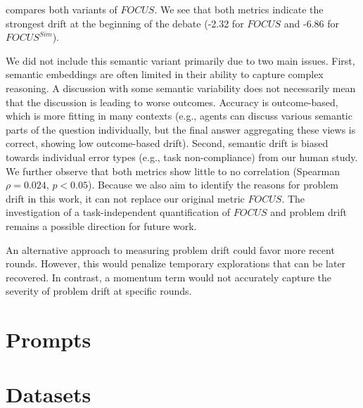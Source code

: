 

 compares both variants of $FOCUS$.
We see that both metrics indicate the strongest drift at the beginning of the debate (-2.32 for $FOCUS$ and -6.86 for $FOCUS^{Sim}$).

We did not include this semantic variant primarily due to two main issues. First, semantic embeddings are often limited in their ability to capture complex reasoning. A discussion with some semantic variability does not necessarily mean that the discussion is leading to worse outcomes. Accuracy is outcome-based, which is more fitting in many contexts (e.g., agents can discuss various semantic parts of the question individually, but the final answer aggregating these views is correct, showing low outcome-based drift). Second, semantic drift is biased towards individual error types (e.g., task non-compliance) from our human study.
We further observe that both metrics show little to no correlation (Spearman $\rho=0.024$, $p<0.05$).
Because we also aim to identify the reasons for problem drift in this work, it can not replace our original metric $FOCUS$.
The investigation of a task-independent quantification of $FOCUS$ and problem drift remains a possible direction for future work.

An alternative approach to measuring problem drift could favor more recent rounds. 
However, this would penalize temporary explorations that can be later recovered. 
In contrast, a momentum term would not accurately capture the severity of problem drift at specific rounds.


\section{Prompts} \label{app:prompts}








\onecolumn

\section{Datasets} \label{app:datasets}



